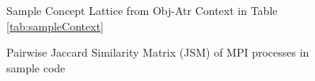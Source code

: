 \begin{figure}[t]
\centering
{}
\caption{Sample Concept Lattice from Obj-Atr Context in Table \ref{tab:sampleContext}}
\label{fig:sampleCL}
\end{figure}



\begin{figure}[]
\centering
{}
\caption{Pairwise Jaccard Similarity Matrix (JSM) of MPI processes in sample code}
\label{fig:jsm2}
\end{figure}

